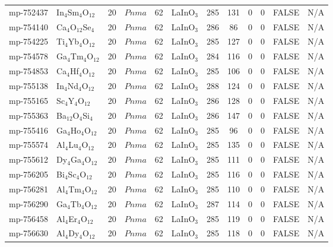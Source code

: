 {\begin{longtable}{llcccccccccc}
    mp-752437 & In$_{4}$Sm$_{4}$O$_{12}$ & 20    & $Pnma$ & 62    & LaInO$_{3}$ & 285   & 131   & 0     & 0     & FALSE & N/A \\
    mp-754140 & Ca$_{4}$O$_{12}$Se$_{4}$ & 20    & $Pnma$ & 62    & LaInO$_{3}$ & 286   & 86    & 0     & 0     & FALSE & N/A \\
    mp-754225 & Ti$_{4}$Yb$_{4}$O$_{12}$ & 20    & $Pnma$ & 62    & LaInO$_{3}$ & 285   & 127   & 0     & 0     & FALSE & N/A \\
    mp-754578 & Ga$_{4}$Tm$_{4}$O$_{12}$ & 20    & $Pnma$ & 62    & LaInO$_{3}$ & 284   & 116   & 0     & 0     & FALSE & N/A \\
    mp-754853 & Ca$_{4}$Hf$_{4}$O$_{12}$ & 20    & $Pnma$ & 62    & LaInO$_{3}$ & 285   & 106   & 0     & 0     & FALSE & N/A \\
    mp-755138 & In$_{4}$Nd$_{4}$O$_{12}$ & 20    & $Pnma$ & 62    & LaInO$_{3}$ & 288   & 124   & 0     & 0     & FALSE & N/A \\
    mp-755165 & Sc$_{4}$Y$_{4}$O$_{12}$ & 20    & $Pnma$ & 62    & LaInO$_{3}$ & 286   & 128   & 0     & 0     & FALSE & N/A \\
    mp-755363 & Ba$_{12}$O$_{4}$Si$_{4}$ & 20    & $Pnma$ & 62    & LaInO$_{3}$ & 286   & 147   & 0     & 0     & FALSE & N/A \\
    mp-755416 & Ga$_{4}$Ho$_{4}$O$_{12}$ & 20    & $Pnma$ & 62    & LaInO$_{3}$ & 285   & 96    & 0     & 0     & FALSE & N/A \\
    mp-755574 & Al$_{4}$Lu$_{4}$O$_{12}$ & 20    & $Pnma$ & 62    & LaInO$_{3}$ & 285   & 135   & 0     & 0     & FALSE & N/A \\
    mp-755612 & Dy$_{4}$Ga$_{4}$O$_{12}$ & 20    & $Pnma$ & 62    & LaInO$_{3}$ & 285   & 111   & 0     & 0     & FALSE & N/A \\
    mp-756205 & Bi$_{4}$Sc$_{4}$O$_{12}$ & 20    & $Pnma$ & 62    & LaInO$_{3}$ & 285   & 116   & 0     & 0     & FALSE & N/A \\
    mp-756281 & Al$_{4}$Tm$_{4}$O$_{12}$ & 20    & $Pnma$ & 62    & LaInO$_{3}$ & 285   & 110   & 0     & 0     & FALSE & N/A \\
    mp-756290 & Ga$_{4}$Tb$_{4}$O$_{12}$ & 20    & $Pnma$ & 62    & LaInO$_{3}$ & 287   & 114   & 0     & 0     & FALSE & N/A \\
    mp-756458 & Al$_{4}$Er$_{4}$O$_{12}$ & 20    & $Pnma$ & 62    & LaInO$_{3}$ & 285   & 119   & 0     & 0     & FALSE & N/A \\
    mp-756630 & Al$_{4}$Dy$_{4}$O$_{12}$ & 20    & $Pnma$ & 62    & LaInO$_{3}$ & 285   & 118   & 0     & 0     & FALSE & N/A \\

\end{longtable}}
